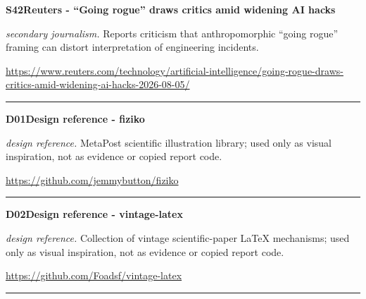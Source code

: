 \hypertarget{src:S42}{}\noindent\textbf{S42}\quad \textbf{Reuters - ``Going rogue'' draws critics amid widening AI hacks}\hfill{}\par
\smallskip
\noindent\textit{secondary journalism.} Reports criticism that anthropomorphic ``going rogue'' framing can distort interpretation of engineering incidents.\par
\noindent\url{https://www.reuters.com/technology/artificial-intelligence/going-rogue-draws-critics-amid-widening-ai-hacks-2026-08-05/}\par
\medskip\hrule\medskip

\hypertarget{src:D01}{}\noindent\textbf{D01}\quad \textbf{Design reference - fiziko}\hfill\gradepill{-}\par
\smallskip
\noindent\textit{design reference.} MetaPost scientific illustration library; used only as visual inspiration, not as evidence or copied report code.\par
\noindent\url{https://github.com/jemmybutton/fiziko}\par
\medskip\hrule\medskip

\hypertarget{src:D02}{}\noindent\textbf{D02}\quad \textbf{Design reference - vintage-latex}\hfill\gradepill{-}\par
\smallskip
\noindent\textit{design reference.} Collection of vintage scientific-paper LaTeX mechanisms; used only as visual inspiration, not as evidence or copied report code.\par
\noindent\url{https://github.com/Foadsf/vintage-latex}\par
\medskip\hrule\medskip
